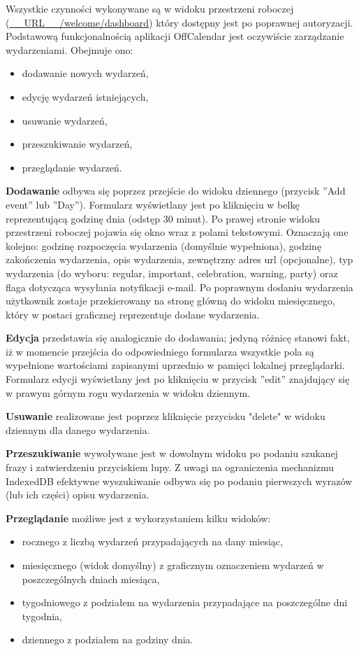 Wszystkie czynności wykonywane są w widoku przestrzeni roboczej (\url{__URL__/welcome/dashboard}) który dostępny jest po poprawnej autoryzacji. Podstawową funkcjonalnością aplikacji OffCalendar jest oczywiście zarządzanie wydarzeniami. Obejmuje ono:

\begin{itemize}
\item dodawanie nowych wydarzeń,
\item edycję wydarzeń istniejących,
\item usuwanie wydarzeń,
\item przeszukiwanie wydarzeń,
\item przeglądanie wydarzeń.
\end{itemize}

\textbf{Dodawanie} odbywa się poprzez przejście do widoku dziennego (przycisk ''Add event'' lub ''Day''). Formularz wyświetlany jest po kliknięciu w belkę reprezentującą godzinę dnia (odstęp 30 minut). Po prawej stronie widoku przestrzeni roboczej pojawia się okno wraz z polami tekstowymi. Oznaczają one kolejno: godzinę rozpoczęcia wydarzenia (domyślnie wypełniona), godzinę zakończenia wydarzenia, opis wydarzenia, zewnętrzny adres url (opcjonalne), typ wydarzenia (do wyboru: regular, important, celebration, warning, party) oraz flaga dotycząca wysyłania notyfikacji e-mail. Po poprawnym dodaniu wydarzenia użytkownik zostaje przekierowany na stronę główną do widoku miesięcznego, który w postaci graficznej reprezentuje dodane wydarzenia.

\textbf{Edycja} przedstawia się analogicznie do dodawania; jedyną różnicę stanowi fakt, iż w momencie przejścia do odpowiedniego formularza wszystkie pola są wypełnione wartościami zapisanymi uprzednio w pamięci lokalnej przeglądarki. Formularz edycji wyświetlany jest po kliknięciu w przycisk ''edit'' znajdujący się w prawym górnym rogu wydarzenia w widoku dziennym.

\textbf{Usuwanie} realizowane jest poprzez kliknięcie przycisku "delete"{} w widoku dziennym dla danego wydarzenia.

\textbf{Przeszukiwanie} wywoływane jest w dowolnym widoku po podaniu szukanej frazy i zatwierdzeniu przyciskiem lupy. Z uwagi na ograniczenia mechanizmu IndexedDB efektywne wyszukiwanie odbywa się po podaniu pierwszych wyrazów (lub ich części) opisu wydarzenia.

\textbf{Przeglądanie} możliwe jest z wykorzystaniem kilku widoków:

\begin{itemize}
\item rocznego z liczbą wydarzeń przypadających na dany miesiąc,
\item miesięcznego (widok domyślny) z graficznym oznaczeniem wydarzeń w poszczególnych dniach miesiąca,
\item tygodniowego z podziałem na wydarzenia przypadające na poszczególne dni tygodnia,
\item dziennego z podziałem na godziny dnia.
\end{itemize}

